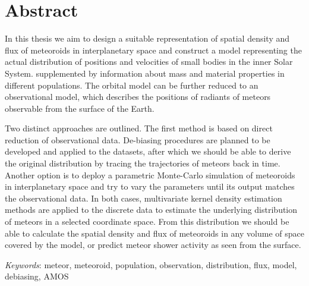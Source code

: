 \section*{Abstract}
    In this thesis we aim to design a suitable representation of spatial density
    and flux of meteoroids in interplanetary space and construct a model representing
    the actual distribution of positions and velocities of small bodies in the inner Solar System.
    supplemented by information about mass and material properties in different populations.
    The orbital model can be further reduced to an observational model,
    which describes the positions of radiants of meteors observable from the surface of the Earth.

    Two distinct approaches are outlined.
    The first method is based on direct reduction of observational data.
    De-biasing procedures are planned to be developed and applied to the datasets,
    after which we should be able to derive the original distribution by tracing the trajectories of meteors back in time.
    Another option is to deploy a parametric Monte-Carlo simulation of meteoroids in interplanetary space
    and try to vary the parameters until its output matches the observational data.
    In both cases, multivariate kernel density estimation methods are applied to the discrete
    data to estimate the underlying distribution of meteors in a selected coordinate space.
    From this distribution we should be able to calculate the spatial density and flux of meteoroids
    in any volume of space covered by the model, or predict meteor shower activity as
    seen from the surface.

    \emph{Keywords}: meteor, meteoroid, population, observation, distribution, flux, model, debiasing, AMOS
